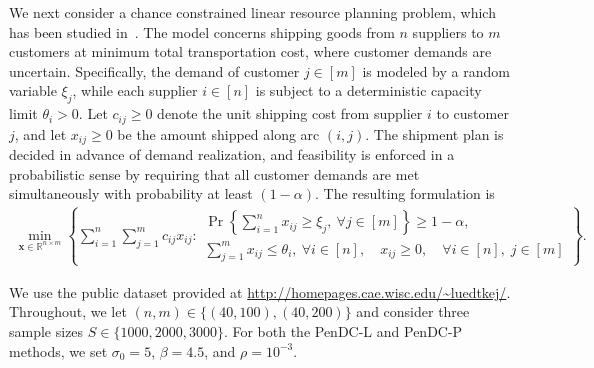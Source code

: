 \documentclass[11pt]{article}
\def\bs{\boldsymbol}
\def\Re{\mathbb{R}}
\begin{document}
We next consider a chance constrained linear resource planning problem, which has been studied in~\cite{luedtke2010integer, bai2021augmented}. The model concerns shipping goods from $n$ suppliers to $m$ customers at minimum total transportation cost, where customer demands are uncertain. Specifically, the demand of customer $j\in[m]$ is modeled by a random variable $\xi_j$, while each supplier $i\in[n]$ is subject to a deterministic capacity limit $\theta_i>0$. Let $c_{ij}\ge 0$ denote the unit shipping cost from supplier $i$ to customer $j$, and let $x_{ij}\ge 0$ be the amount shipped along arc $(i,j)$. The shipment plan is decided in advance of demand realization, and feasibility is enforced in a probabilistic sense by requiring that all customer demands are met simultaneously with probability at least $(1-\alpha)$. The resulting formulation is
\begin{align*}
\min_{\bs{x}\in\Re^{n\times m}} \left\{ \sum_{i=1}^n \sum_{j=1}^m c_{ij}x_{ij}:
 \begin{array}{l}
\displaystyle \Pr\left\{\sum_{i=1}^n x_{ij}\ge \xi_j,\ \forall j\in[m]\right\}\ge 1-\alpha, \\
\displaystyle \sum_{j=1}^m x_{ij}\le \theta_i,\ \forall i\in[n],
\quad x_{ij}\ge 0, \quad \forall i\in[n], \;j\in[m]
 \end{array}\right\}.
\end{align*}

We use the public dataset provided at \url{http://homepages.cae.wisc.edu/~luedtkej/}. Throughout, we let $(n,m)\in\{(40,100), (40, 200)\}$ and consider three sample sizes $S\in\{1000,2000, 3000\}$. For both the PenDC-L and PenDC-P methods, we set $\sigma_0 = 5$, $\beta  = 4.5$, and $\rho = 10^{-3}$.
\end{document}
